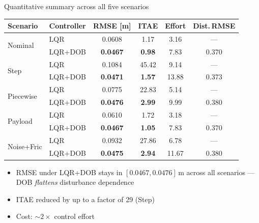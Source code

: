 \documentclass[10pt,aspectratio=169]{beamer}
\begin{document}
\begin{frame}{Quantitative summary across all five scenarios}
  \centering
  \scriptsize
  \begin{tabular}{llcccc}
    \toprule
    Scenario & Controller & RMSE [m] & ITAE & Effort & Dist.\,RMSE\\
    \midrule
    \multirow{2}{*}{Nominal}      & LQR     & 0.0608 & 1.17  & 3.16  & ---\\
                                  & LQR+DOB & \textbf{0.0467} & \textbf{0.98}  & 7.83  & 0.370\\
    \midrule
    \multirow{2}{*}{Step}         & LQR     & 0.1084 & 45.42 & 9.14  & ---\\
                                  & LQR+DOB & \textbf{0.0471} & \textbf{1.57}  & 13.88 & 0.373\\
    \midrule
    \multirow{2}{*}{Piecewise}    & LQR     & 0.0775 & 22.83 & 5.14  & ---\\
                                  & LQR+DOB & \textbf{0.0476} & \textbf{2.99}  & 9.99  & 0.380\\
    \midrule
    \multirow{2}{*}{Payload}      & LQR     & 0.0610 & 1.72  & 3.18  & ---\\
                                  & LQR+DOB & \textbf{0.0467} & \textbf{1.05}  & 7.83  & 0.370\\
    \midrule
    \multirow{2}{*}{Noise+Fric}   & LQR     & 0.0932 & 27.86 & 6.78  & ---\\
                                  & LQR+DOB & \textbf{0.0475} & \textbf{2.94}  & 11.67 & 0.380\\
    \bottomrule
  \end{tabular}

  \vspace{0.6em}
  \normalsize
  \begin{itemize}
    \item RMSE under LQR+DOB \alert{stays in $[0.0467, 0.0476]$}\,m across all
          scenarios — DOB \emph{flattens} disturbance dependence
    \item ITAE reduced by \alert{up to a factor of 29} (Step)
    \item Cost: $\sim 2\times$ control effort
  \end{itemize}
\end{frame}
\end{document}
